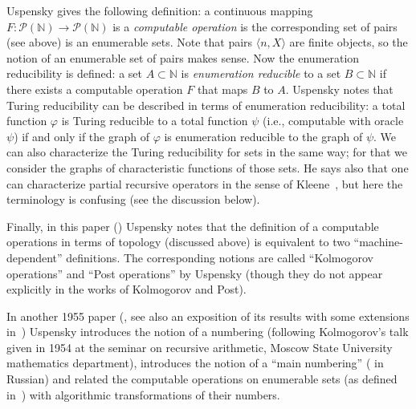 \documentclass[12pt]{article}
\theoremstyle{remark}
\begin{document}
Uspensky gives the following definition: a continuous mapping $F\colon \mathcal{P}(\mathbb{N})\to\mathcal{P}(\mathbb{N})$ is a  \emph{computable operation} is the corresponding set of pairs (see above) is an enumerable sets. Note that pairs $\langle n,X\rangle$ are finite objects, so the notion of an enumerable set of pairs makes sense. Now the enumeration reducibility is defined: a set $A\subset \mathbb{N}$ is \emph{enumeration reducible} to a set $B\subset\mathbb{N}$ if there exists a computable operation $F$ that maps $B$ to $A$. Uspensky notes that Turing reducibility can be described in terms of enumeration reducibility: a total  function $\varphi$ is Turing reducible to a total function $\psi$ (i.e., computable with oracle $\psi$) if and only if the graph of $\varphi$ is enumeration reducible to the graph of $\psi$. We can also characterize the Turing reducibility for sets in the same way; for that we consider the graphs of characteristic functions of those sets. He says also that one can characterize partial recursive operators in the sense of Kleene~\cite{Kleene1957}, but here the terminology is confusing (see the discussion below).

Finally, in this paper (\cite{1955}) Uspensky notes that the definition of a computable operations in terms of topology (discussed above) is equivalent to two ``machine-dependent'' definitions. The corresponding notions are called ``Kolmogorov operations'' and ``Post operations'' by Uspensky (though they do not appear explicitly in the works of Kolmogorov and Post).

In another 1955 paper (\cite{1955a}, see also an exposition of its results with some extensions in~\cite{1956}) Uspensky introduces the notion of a numbering (following Kolmogorov's talk given in 1954 at the seminar on recursive arithmetic, Moscow State University mathematics department), introduces the notion of a ``main numbering'' ( in Russian) and related the computable operations on enumerable sets (as defined in~\cite{1955}) with algorithmic transformations of their numbers.
\end{document}
